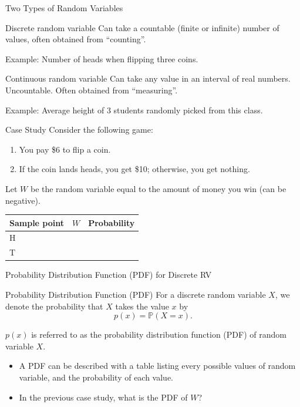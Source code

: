 \documentclass{beamer}
\newcommand{\pr}{\mathbb{P}}
\begin{document}
\begin{frame}{Two Types of Random Variables}
\begin{block}{Discrete random variable}
Can take a countable (finite or infinite) number of values, often obtained from ``counting''.
\end{block}
Example: Number of heads when flipping three coins.

\begin{block}{Continuous random variable}
Can take any value in an interval of real numbers.
Uncountable.  Often obtained from ``measuring''.
\end{block}
Example: Average height of 3 students randomly picked from this class.
\end{frame}

\begin{frame}{Case Study}
Consider the following game:
\begin{enumerate}
\item You pay \$6 to flip a coin.
\item If the coin lands heads, you get \$10; otherwise, you get nothing.
\end{enumerate}

Let $W$ be the random variable equal to the amount of money you win (can be negative).
\begin{center}
\begin{tabular}{|P{2.5cm}|P{2cm}|P{2cm}|} \hline
Sample point & $W$ & Probability\\ \hline
H &  & \\ \hline
T & &  \\ \hline
\end{tabular}
\end{center}
\end{frame}

\begin{frame}{Probability Distribution Function (PDF) for Discrete RV}

\begin{block}{Probability Distribution Function (PDF)}
For a discrete random variable $X$, we denote the probability that \alert{$X$} takes the value \alert{$x$} by
$$ p(x) = \pr(X=x).$$

$p(x)$ is referred to as the \alert{probability distribution function} (PDF) of random variable $X$.
\end{block}

\begin{itemize}
\item A PDF can be described with a table listing every possible values of random variable, and the probability of each value.
\item In the previous case study, what is the PDF of $W$? 
\end{itemize}
\end{frame}
\end{document}
